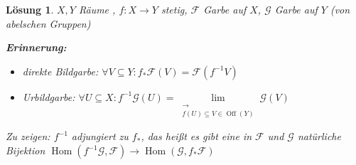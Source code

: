 \documentclass[a4paper,12pt]{report}
\theoremstyle{break}
\newtheorem{Loes}{L\"osung}
\theoremstyle{nonumberbreak}
\theoremstyle{nonumberplain}
\DeclareMathOperator{\Hom}{Hom}
\DeclareMathOperator{\Off}{Off}
\newcommand{\calF}{\mathcal{F}}
\newcommand{\calG}{\mathcal{G}}
\begin{document}
\begin{Loes}
$X, Y$ R\"aume , $f: X \to Y$ stetig, $\calF$ Garbe auf $X$, $\calG$ Garbe auf $Y$ (von abelschen Gruppen)

\textbf{Erinnerung:}\begin{itemize}
\item direkte Bildgarbe: $\forall  V \subseteq Y: f_{*}\calF(V) = \calF(f^{-1} V)$
\item Urbildgarbe: $\forall U\subseteq X: f^{-1} \calG(U) = \lim\limits_{\substack{\to \\ f(U) \subseteq V \in \Off(Y)}} \calG(V)$
\end{itemize}
\emph{Zu zeigen:} $f^{-1}$ adjungiert zu $f_{*}$, das hei\ss t es gibt eine in $\calF$ und $\calG$ nat\"urliche Bijektion $\Hom(f^{-1}\calG, \calF) \to \Hom(\calG, f_*\calF)$


\end{Loes}
\end{document}

